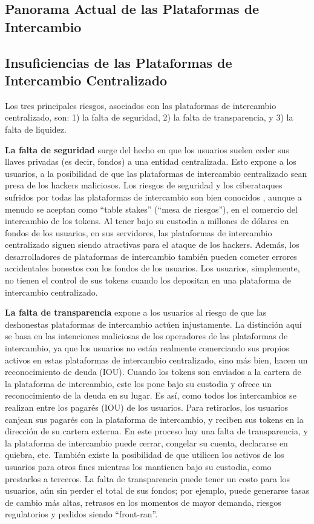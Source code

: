 \documentclass[UTF8,nofonts]{article}
\begin{document}
\begin{multicols}{2}
\section{Panorama Actual de las Plataformas de Intercambio\label{sec:current_exchange_landscape}}

\subsection{Insuficiencias de las Plataformas de Intercambio Centralizado}
Los tres principales riesgos, asociados con las plataformas de intercambio centralizado, son: 1) la falta de seguridad, 2) la falta de transparencia, y 3) la falta de liquidez.

\textbf{La falta de seguridad} surge del hecho en que los usuarios suelen ceder sus llaves privadas (es decir, fondos) a una entidad centralizada. Esto expone a los usuarios, a la posibilidad de que las plataformas de intercambio centralizado sean presa de los hackers maliciosos. Los riesgos de seguridad y los ciberataques sufridos por todas las plataformas de intercambio son bien conocidos \cite{coincheckhack}  \cite{mcmillan2014inside}, aunque a menudo se aceptan como \enquote{table stakes} (\enquote{mesa de riesgos}), en el comercio del intercambio de los tokens. Al tener bajo su custodia a millones de d\'olares en fondos de los usuarios, en sus servidores, las plataformas de intercambio centralizado siguen siendo atractivas para el ataque de los hackers. Adem\'as, los desarrolladores de plataformas de intercambio tambi\'en pueden cometer errores accidentales honestos con los fondos de los usuarios. Los usuarios, simplemente, no tienen el control de sus tokens cuando los depositan en una plataforma de intercambio centralizado.

\textbf{La falta de transparencia} expone a los usuarios al riesgo de que las deshonestas plataformas de intercambio act\'uen injustamente. La distinci\'on aqu\'i se basa en las intenciones maliciosas de los operadores de las plataformas de intercambio, ya que los usuarios no est\'an realmente comerciando sus propios activos en estas plataformas de intercambio centralizado, sino m\'as bien, hacen un reconocimiento de deuda (IOU). Cuando los tokens son enviados a la cartera de la plataforma de intercambio, este los pone bajo su custodia y ofrece un reconocimiento de la deuda en su lugar. Es as\'i, como todos los intercambios se realizan entre los pagar\'es (IOU) de los usuarios. Para retirarlos, los usuarios canjean sus pagar\'es con la plataforma de intercambio, y reciben sus tokens en la direcci\'on de su cartera externa. En este proceso hay una falta de transparencia, y la plataforma de intercambio puede cerrar, congelar su cuenta, declararse en quiebra, etc. Tambi\'en existe la posibilidad de que utilicen los activos de los usuarios para otros fines mientras los mantienen bajo su custodia, como prestarlos a terceros. La falta de transparencia puede tener un costo para los usuarios, a\'un sin perder el total de sus fondos; por ejemplo, puede generarse tasas de cambio m\'as altas, retrasos en los momentos de mayor demanda, riesgos regulatorios y pedidos siendo \enquote{front-ran}.



\end{multicols}
\end{document}
